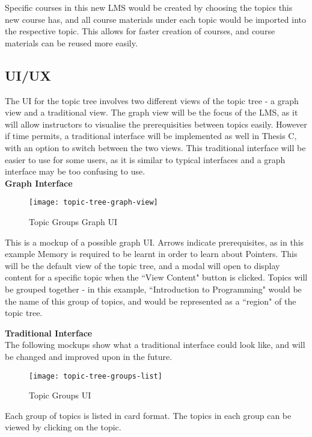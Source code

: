 Specific courses in this new LMS would be created by choosing the topics this new course has, and all course materials under each topic would be imported into the respective topic. This allows for faster creation of courses, and course materials can be reused more easily.\\

\subsection{UI/UX}
The UI for the topic tree involves two different views of the topic tree - a graph view and a traditional view. The graph view will be the focus of the LMS, as it will allow instructors to visualise the prerequisities between topics easily. However if time permits, a traditional interface will be implemented as well in Thesis C, with an option to switch between the two views. This traditional interface will be easier to use for some users, as it is similar to typical interfaces and a graph interface may be too confusing to use.\\

\newpage
\textbf{Graph Interface}

\begin{figure}[h!]
    \centering
    \texttt{[image: topic-tree-graph-view]}
    \caption{Topic Groups Graph UI}
\end{figure}

This is a mockup of a possible graph UI. Arrows indicate prerequisites, as in this example Memory is required to be learnt in order to learn about Pointers. This will be the default view of the topic tree, and a modal will open to display content for a specific topic when the ``View Content" button is clicked. Topics will be grouped together - in this example, ``Introduction to Programming" would be the name of this group of topics, and would be represented as a ``region" of the topic tree.

\textbf{Traditional Interface}\\
The following mockups show what a traditional interface could look like, and will be changed and improved upon in the future.\\
\begin{figure}[h!]
    \centering
    \texttt{[image: topic-tree-groups-list]}
    \caption{Topic Groups UI}
\end{figure}

\newpage

Each group of topics is listed in card format. The topics in each group can be viewed by clicking on the topic.\\

